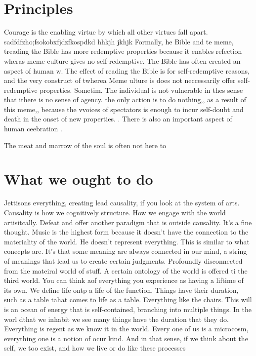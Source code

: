 \documentclass[12pt,letterpaper]{article}
\begin{document}
\section{Principles}
Courage is the enabling virtue by which all other virtues fall apart. 
sadfdfzho;fsokobxfjdzfkospdkd hhkjh jkhjk 
Formally, he Bible and te meme, treading the Bible has more redemptive properties because it enables refection wheras meme culture gives no self-redemptive.  The Bible has often created an aspect of human  w.  The effect of reading the Bible is for self-redemptive reasons, and the very construct of twherea Meme ulture is does not neccessarily offer self-redemptive properties. Sometim.  The individual is not vulnerable in thes sense that ithere is no sense of agency.  the only action is to do nothing,, as a result of this  meme,, because the vvoices of spectators is enough to incur self-doubt and death in the onset of new properties.  .  There is also an important aspect of human ceebration .

The  meat and marrow  of the soul is often not here to 
\section{What we ought to do}
Jettisons everything, creating lead causality,  if you look  at the system of arts.  Causality is how we cognitively structure.  How we engage with the world artisitcally.  Defeat and offer another paradigm that is outside causality.  It's a fine thought.  Music is the highest form because it doesn't have the connection to the materiality of the world.  He doesn't represent everything.  This is similar to what conecpts are.  It's that some meaning are always connected in our mind, a string of meanings that lead us to create certain judgments.  Profoundly disconnected from the mateiral world of stuff.  A certain ontology of the world is offered ti the third world.  You can think aof everything you experience as having a liftime of its own.  We define life ontp a life of the function.  Things have their duration, such as a table tahat comes to life as a table.  Everything like the chairs.  This will is an ocean of energy that is self-contained, branching into multiple things.  In the worl dthat we inhabit we see many things have the duration that they do.  Everything is regent as we know it in the world.  Every one of us is a microcosm, everything one is a notion of ocur kind.  And in that sense, if we think about the self, we too exist, and how we live or do like these processes
\end{document}
